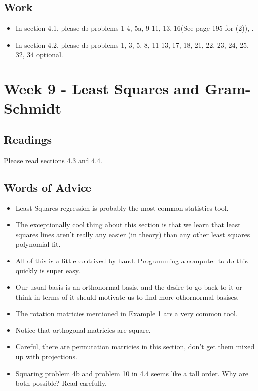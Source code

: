 	\subsection{Work}
		\begin{itemize}
			\item In section 4.1, please do problems 1-4, 5a, 9-11, 13, 16(See page 195 for (2)), .
			\item In section 4.2, please do problems 1, 3, 5, 8, 11-13, 17, 18, 21, 22, 23, 24, 25, 32, 34 optional.
		\end{itemize}

	\clearpage



	\section{Week 9 - Least Squares and Gram-Schmidt}

	\subsection{Readings}
		Please read sections 4.3 and 4.4.

	\subsection{Words of Advice}
		\begin{itemize}
			\item Least Squares regression is probably the most common statistics tool.
			\item The exceptionally cool thing about this section is that we learn that least squares lines aren't really any easier (in theory) than any other least squares polynomial fit.
			\item All of this is a little contrived by hand. Programming a computer to do this quickly is super easy.
			\item Our usual basis is an orthonormal basis, and the desire to go back to it or think in terms of it should motivate us to find more othornormal basises.
			\item The rotation matricies mentioned in Example 1 are a very common tool.
			\item Notice that orthogonal matricies are square.
			\item Careful, there are permutation matricies in this section, don't get them mixed up with projections.
			\item Squaring problem 4b and problem 10 in 4.4 seems like a tall order. Why are both possible? Read carefully.
		\end{itemize}

